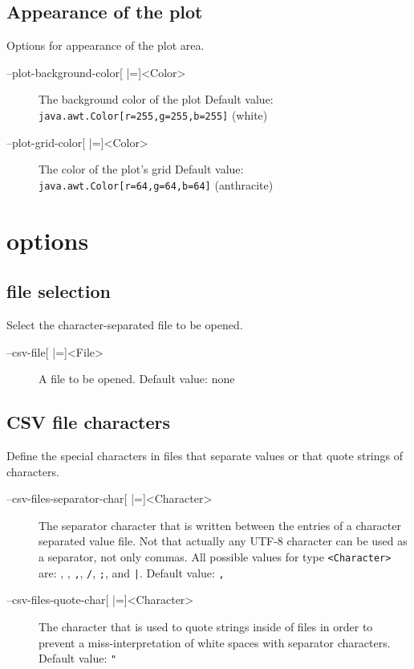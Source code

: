 \subsection{Appearance of the plot}
Options for appearance of the plot area.
\begin{description}
\item[--plot-background-color{[} |={]}<Color>]
          The background color of the plot
          Default value:\\\texttt{java.awt.Color[r=255,g=255,b=255]} (white)
\item[--plot-grid-color{[} |={]}<Color>] The color of the plot's grid
          Default value:\\\texttt{java.awt.Color[r=64,g=64,b=64]} (\textcolor{anthracite}{anthracite})
\end{description}

\section{\CSV options}
\subsection{\CSV file selection}
Select the character-separated file to be opened.
\begin{description}
\item[--csv-file{[} |={]}<File>]
          A \CSV file to be opened.
          Default value: none
\end{description}

\subsection{CSV file characters}
Define the special characters in \CSV files that separate values or that quote strings of characters.
\begin{description}
\item[--csv-files-separator-char{[} |={]}<Character>]
          The separator character that is written between the entries of
          a character separated value file. Not that actually any \ac{UTF}-8
          character can be used as a separator, not only commas.
          All possible values for type \texttt{<Character>} are:
          \tab, \textvisiblespace,
          \texttt{,}, \texttt{/},
          \texttt{;},  and \texttt{|}.
          Default value: \texttt{,}
\item[--csv-files-quote-char{[} |={]}<Character>]
          The character that is used to quote strings inside of \CSV
          files in order to prevent a miss-interpretation of white
          spaces with separator characters.
          Default value: \texttt{"}
\end{description}


